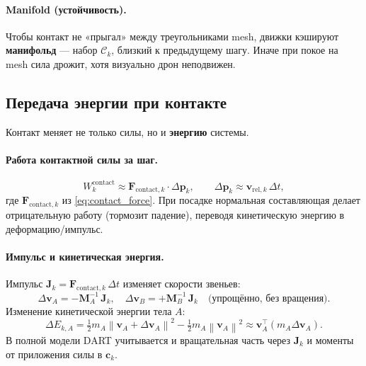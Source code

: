 \documentclass[a4paper,11pt]{article}
\newcommand{\vect}[1]{\bm{#1}}
\newcommand{\mat}[1]{\bm{#1}}
\newcommand{\norm}[1]{\left\lVert #1 \right\rVert}
\begin{document}
\paragraph{Manifold (устойчивость).}
Чтобы контакт не «прыгал» между треугольниками mesh, движки кэшируют
\textbf{манифольд} --- набор $\mathcal{C}_k$, близкий к предыдущему шагу.
Иначе при покое на mesh сила дрожит, хотя визуально дрон неподвижен.

\subsection{Передача энергии при контакте}

Контакт меняет не только силы, но и \textbf{энергию} системы.

\paragraph{Работа контактной силы за шаг.}
\begin{equation}
  W_k^{\mathrm{contact}} \approx
  \vect{F}_{\mathrm{contact},k} \cdot \Delta\vect{p}_k,
  \qquad
  \Delta\vect{p}_k \approx \vect{v}_{\mathrm{rel},k}\,\Delta t,
  \label{eq:contact_work}
\end{equation}
где $\vect{F}_{\mathrm{contact},k}$ из \eqref{eq:contact_force}.
При посадке нормальная составляющая делает отрицательную работу
(тормозит падение), переводя кинетическую энергию в деформацию/импульс.

\paragraph{Импульс и кинетическая энергия.}
Импульс $\vect{J}_k = \vect{F}_{\mathrm{contact},k}\,\Delta t$
изменяет скорости звеньев:
\begin{equation}
  \Delta \vect{v}_A = -\mat{M}_A^{-1}\,\vect{J}_k,\quad
  \Delta \vect{v}_B = +\mat{M}_B^{-1}\,\vect{J}_k
  \quad \text{(упрощённо, без вращения)}.
\end{equation}
Изменение кинетической энергии тела $A$:
\begin{equation}
  \Delta E_{k,A} =
  \tfrac{1}{2} m_A \norm{\vect{v}_A+\Delta\vect{v}_A}^2
  - \tfrac{1}{2} m_A \norm{\vect{v}_A}^2
  \approx \vect{v}_A^\top (m_A \Delta\vect{v}_A).
  \label{eq:delta_KE}
\end{equation}
В полной модели DART учитывается и вращательная часть через
$\vect{J}_k$ и моменты от приложения силы в $\vect{c}_k$.
\end{document}
